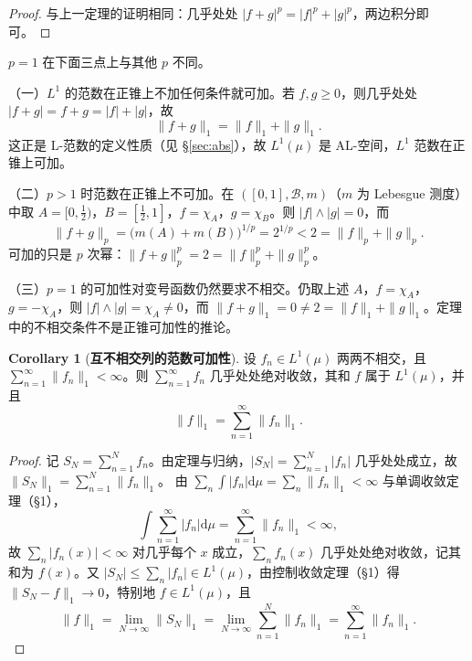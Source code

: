 \documentclass[oneside]{book}
\theoremstyle{definition}
\newcommand{\dd}{\mathrm{d}}
\theoremstyle{definition}
\newtheorem{corollary}{Corollary}[section]
\begin{document}
	\begin{proof}
		与上一定理的证明相同：几乎处处 $|f+g|^{p}=|f|^{p}+|g|^{p}$，两边积分即可。
	\end{proof}
	
	$p=1$ 在下面三点上与其他 $p$ 不同。
	
	（一）$L^{1}$ 的范数在正锥上不加任何条件就可加。若 $f,g\geqslant0$，则几乎处处 $|f+g|=f+g=|f|+|g|$，故
	\[
	\|f+g\|_{1}=\|f\|_{1}+\|g\|_{1}.
	\]
	这正是 L-范数的定义性质（见 \S\ref{sec:abs}），故 $L^{1}(\mu)$ 是 AL-空间，$L^{1}$ 范数在正锥上可加。
	
	（二）$p>1$ 时范数在正锥上不可加。在 $([0,1],\mathcal{B},m)$（$m$ 为 Lebesgue 测度）中取 $A=[0,\tfrac12)$，$B=[\tfrac12,1]$，$f=\chi_{A}$，$g=\chi_{B}$。则 $|f|\wedge|g|=0$，而
	\[
	\|f+g\|_{p}=\big(m(A)+m(B)\big)^{1/p}=2^{1/p}<2=\|f\|_{p}+\|g\|_{p}.
	\]
	可加的只是 $p$ 次幂：$\|f+g\|_{p}^{p}=2=\|f\|_{p}^{p}+\|g\|_{p}^{p}$。
	
	（三）$p=1$ 的可加性对变号函数仍然要求不相交。仍取上述 $A$，$f=\chi_{A}$，$g=-\chi_{A}$，则 $|f|\wedge|g|=\chi_{A}\neq0$，而 $\|f+g\|_{1}=0\neq2=\|f\|_{1}+\|g\|_{1}$。定理中的不相交条件不是正锥可加性的推论。
	
	\begin{corollary}[\bfseries{互不相交列的范数可加性}]
		设 $f_{n}\in L^{1}(\mu)$ 两两不相交，且 $\sum_{n=1}^{\infty}\|f_{n}\|_{1}<\infty$。则 $\sum_{n=1}^{\infty}f_{n}$ 几乎处处绝对收敛，其和 $f$ 属于 $L^{1}(\mu)$，并且
		\[
		\|f\|_{1}=\sum_{n=1}^{\infty}\|f_{n}\|_{1}.
		\]
	\end{corollary}
	
	\begin{proof}
		记 $S_{N}=\sum_{n=1}^{N}f_{n}$。由定理与归纳，$|S_{N}|=\sum_{n=1}^{N}|f_{n}|$ 几乎处处成立，故 $\|S_{N}\|_{1}=\sum_{n=1}^{N}\|f_{n}\|_{1}$。
		由 $\sum_{n}\int|f_{n}|\dd\mu=\sum_{n}\|f_{n}\|_{1}<\infty$ 与单调收敛定理（\S 1），
		\[
		\int\sum_{n=1}^{\infty}|f_{n}|\dd\mu=\sum_{n=1}^{\infty}\|f_{n}\|_{1}<\infty,
		\]
		故 $\sum_{n}|f_{n}(x)|<\infty$ 对几乎每个 $x$ 成立，$\sum_{n}f_{n}(x)$ 几乎处处绝对收敛，记其和为 $f(x)$。又 $|S_{N}|\leqslant\sum_{n}|f_{n}|\in L^{1}(\mu)$，由控制收敛定理（\S 1）得 $\|S_{N}-f\|_{1}\to0$，特别地 $f\in L^{1}(\mu)$，且
		\[
		\|f\|_{1}=\lim_{N\to\infty}\|S_{N}\|_{1}=\lim_{N\to\infty}\sum_{n=1}^{N}\|f_{n}\|_{1}=\sum_{n=1}^{\infty}\|f_{n}\|_{1}.
		\]
	\end{proof}
	
\end{document}

